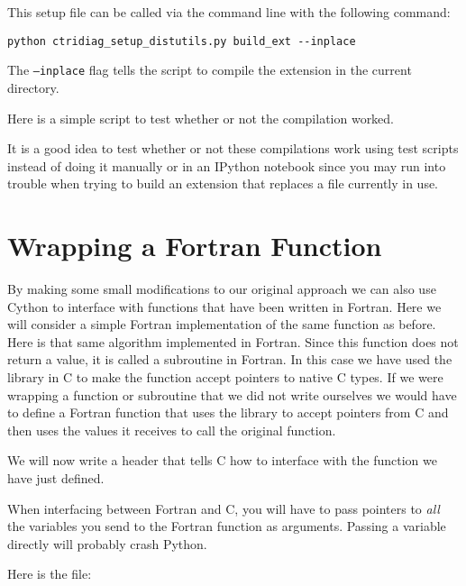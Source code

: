 

This setup file can be called via the command line with the following command:
\begin{lstlisting}[style=ShellInput]
python ctridiag_setup_distutils.py build_ext --inplace
\end{lstlisting}
The \texttt{--inplace} flag tells the script to compile the extension in the current directory.

Here is a simple script to test whether or not the compilation worked.



\begin{info}
It is a good idea to test whether or not these compilations work using test scripts instead of doing it manually or in an IPython notebook since you may run into trouble when trying to build an extension that replaces a file currently in use.
\end{info}

\section*{Wrapping a Fortran Function}
By making some small modifications to our original approach we can also use Cython to interface with functions that have been written in Fortran.
Here we will consider a simple Fortran implementation of the same function as before.
Here is that same algorithm implemented in Fortran.
Since this function does not return a value, it is called a subroutine in Fortran.
In this case we have used the  library in C to make the function accept pointers to native C types.
If we were wrapping a function or subroutine that we did not write ourselves we would have to define a Fortran function that uses the  library to accept pointers from C and then uses the values it receives to call the original function.


We will now write a header that tells C how to interface with the function we have just defined.
\begin{warn}
When interfacing between Fortran and C, you will have to pass pointers to \emph{all} the variables you send to the Fortran function as arguments.
Passing a variable directly will probably crash Python.
\end{warn}
Here is the file:


